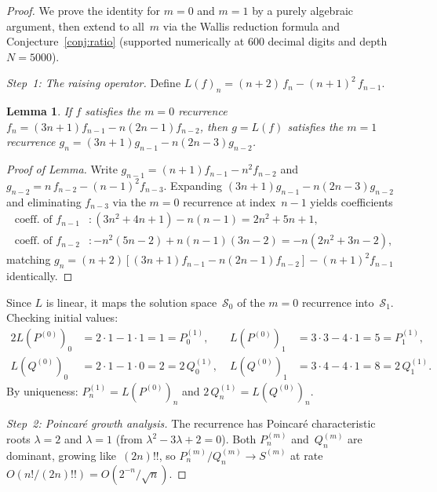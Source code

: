 \documentclass[11pt,a4paper]{article}
\theoremstyle{plain}
\newtheorem{lemma}[theorem]{Lemma}
\theoremstyle{definition}
\theoremstyle{remark}
\begin{document}
\begin{proof}
We prove the identity for $m = 0$ and $m = 1$ by a purely algebraic
argument, then extend to all~$m$ via the Wallis reduction formula and
Conjecture~\ref{conj:ratio} (supported numerically at $600$ decimal digits and depth $N=5000$).

\medskip
\emph{Step~1: The raising operator.}
Define $L(f)_n = (n{+}2)\,f_n - (n{+}1)^2\,f_{n-1}$.

\begin{lemma}\label{lem:shift}
If\/ $f$ satisfies the $m{=}0$ recurrence
$f_n = (3n{+}1)f_{n-1} - n(2n{-}1)f_{n-2}$,
then $g = L(f)$ satisfies the $m{=}1$ recurrence
$g_n = (3n{+}1)g_{n-1} - n(2n{-}3)g_{n-2}$.
\end{lemma}

\begin{proof}[Proof of Lemma]
Write $g_{n-1} = (n{+}1)f_{n-1} - n^2 f_{n-2}$ and
$g_{n-2} = n\,f_{n-2} - (n{-}1)^2 f_{n-3}$.
Expanding $(3n{+}1)g_{n-1} - n(2n{-}3)g_{n-2}$ and
eliminating $f_{n-3}$ via the $m{=}0$ recurrence at index~$n{-}1$
yields coefficients
\begin{align*}
  \text{coeff.\ of } f_{n-1} &:
    (3n^2{+}4n{+}1) - n(n{-}1) = 2n^2{+}5n{+}1, \\
  \text{coeff.\ of } f_{n-2} &:
    {-}n^2(5n{-}2) + n(n{-}1)(3n{-}2) = {-}n(2n^2{+}3n{-}2),
\end{align*}
matching
$g_n = (n{+}2)[(3n{+}1)f_{n-1} - n(2n{-}1)f_{n-2}]
  - (n{+}1)^2 f_{n-1}$
identically.
\end{proof}

Since $L$ is linear, it maps the solution space~$\mathcal{S}_0$
of the $m{=}0$ recurrence into~$\mathcal{S}_1$.
Checking initial values:
\begin{alignat*}{2}
  L(P^{(0)})_0 &= 2\cdot 1 - 1\cdot 1 = 1 = P_0^{(1)},\;
  &L(P^{(0)})_1 &= 3\cdot 3 - 4\cdot 1 = 5 = P_1^{(1)},\\
  L(Q^{(0)})_0 &= 2\cdot 1 - 1\cdot 0 = 2 = 2\,Q_0^{(1)},\;
  &L(Q^{(0)})_1 &= 3\cdot 4 - 4\cdot 1 = 8 = 2\,Q_1^{(1)}.
\end{alignat*}
By uniqueness:
$P_n^{(1)} = L(P^{(0)})_n$ and $2\,Q_n^{(1)} = L(Q^{(0)})_n$.

\medskip
\emph{Step~2: Poincar\'e growth analysis.}
The recurrence has Poincar\'e characteristic roots $\lambda = 2$
and $\lambda = 1$
(from $\lambda^2 - 3\lambda + 2 = 0$).
Both $P_n^{(m)}$ and~$Q_n^{(m)}$ are dominant, growing
like~$(2n)!!$, so $P_n^{(m)}/Q_n^{(m)} \to S^{(m)}$ at
rate~$O(n!/(2n)!!) = O(2^{-n}/\sqrt{n})$.


\end{proof}
\end{document}
